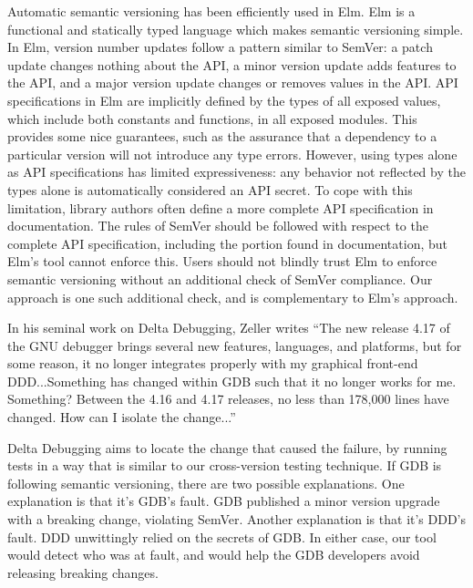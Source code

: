 Automatic semantic versioning has been efficiently used in Elm. Elm
is a functional and statically typed language which makes semantic
versioning simple. In Elm, version number updates follow a pattern
similar to SemVer: a patch update changes nothing about the API, a
minor version update adds features to the API, and a major version
update changes or removes values in the API. API specifications in
Elm are implicitly defined by the types of all exposed values, which
include both constants and functions, in all exposed modules. This
provides some nice guarantees, such as the assurance that a
dependency to a particular version will not introduce any type
errors. However, using types alone as API specifications has limited
expressiveness: any behavior not reflected by the types alone is
automatically considered an API secret. To cope with this limitation,
library authors often define a more complete API specification in
documentation. The rules of SemVer should be followed with respect to
the complete API specification, including the portion found in
documentation, but Elm's tool cannot enforce this. Users should not
blindly trust Elm to enforce semantic versioning without an
additional check of SemVer compliance. Our approach is one such
additional check, and is complementary to Elm's approach.

In his seminal work on Delta Debugging, Zeller writes ``The new
release 4.17 of the GNU debugger brings several new features,
languages, and platforms, but for some reason, it no longer
integrates properly with my graphical front-end DDD...Something has
changed within GDB such that it no longer works for me. Something?
Between the 4.16 and 4.17 releases, no less than 178,000 lines have
changed. How can I isolate the change...''

Delta Debugging aims to locate the change that caused the failure, by
running tests in a way that is similar to our cross-version testing
technique. If GDB is following semantic versioning, there are two
possible explanations. One explanation is that it's GDB's fault. GDB
published a minor version upgrade with a breaking change, violating
SemVer. Another explanation is that it's DDD's fault. DDD unwittingly
relied on the secrets of GDB. In either case, our tool would detect
who was at fault, and would help the GDB developers avoid releasing
breaking changes.

